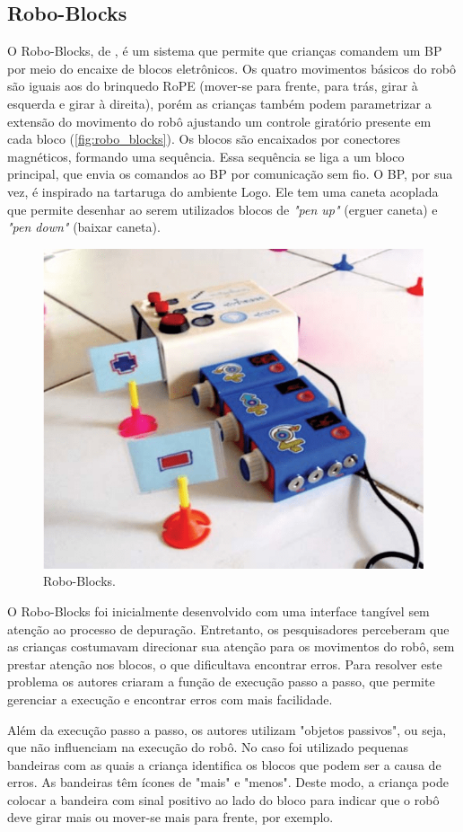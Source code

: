 \subsection{Robo-Blocks}
O Robo-Blocks, de , é um sistema que permite que crianças comandem um BP por meio do encaixe de blocos eletrônicos. Os quatro movimentos básicos do robô são iguais aos do brinquedo RoPE (mover-se para frente, para trás, girar à esquerda e girar à direita), porém as crianças também podem parametrizar a extensão do movimento do robô ajustando um controle giratório presente em cada bloco (\autoref{fig:robo_blocks}). Os blocos são encaixados por conectores magnéticos, formando uma sequência. Essa sequência se liga a um bloco principal, que envia os comandos ao BP por comunicação sem fio. O BP, por sua vez, é inspirado na tartaruga do ambiente Logo. Ele tem uma caneta acoplada que permite desenhar ao serem utilizados blocos de \textit{"pen up"} (erguer caneta) e \textit{"pen down"} (baixar caneta).

\begin{figure}[!h]
    \centering
    \includegraphics[width=.7\linewidth,fbox]{figs/robo_blocks.png}
    \caption{Robo-Blocks.}
    \label{fig:robo_blocks}
\end{figure}
O Robo-Blocks foi inicialmente desenvolvido com uma interface tangível sem atenção ao processo de depuração. Entretanto, os pesquisadores perceberam que as crianças costumavam direcionar sua atenção para os movimentos do robô, sem prestar atenção nos blocos, o que dificultava encontrar erros. Para resolver este problema os autores criaram a função de execução passo a passo, que permite gerenciar a execução e encontrar erros com mais facilidade.

Além da execução passo a passo, os autores utilizam "objetos passivos", ou seja, que não influenciam na execução do robô. No caso foi utilizado pequenas bandeiras com as quais a criança identifica os blocos que podem ser a causa de erros. As bandeiras têm ícones de "mais" e "menos". Deste modo, a criança pode colocar a bandeira com sinal positivo ao lado do bloco para indicar que o robô deve girar mais ou mover-se mais para frente, por exemplo.

